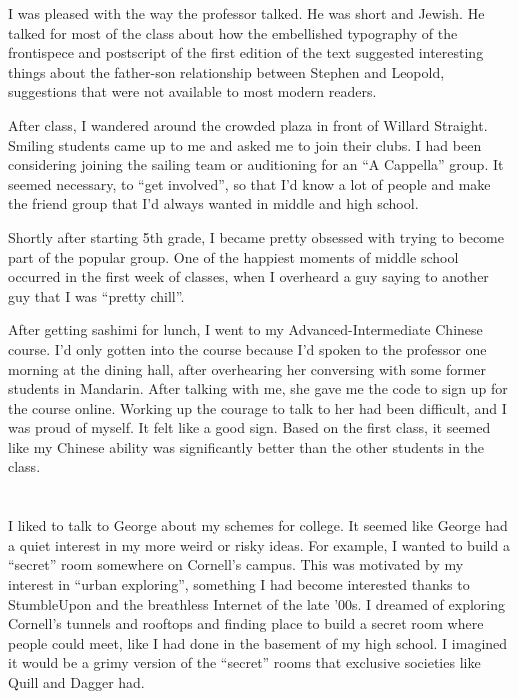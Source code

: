 I was pleased with the way the professor talked.  He was short and Jewish.  He
talked for most of the class about how the embellished typography of the
frontispece and postscript of the first edition of the text suggested
interesting things about the father-son relationship between Stephen and
Leopold, suggestions that were not available to most modern readers.

After class, I wandered around the crowded plaza in front of Willard Straight.
Smiling students came up to me and asked me to join their clubs.  I had been
considering joining the sailing team or auditioning for an ``A Cappella'' group.
It seemed necessary, to ``get involved'', so that I'd know a lot of people and
make the friend group that I'd always wanted in middle and high school.  

Shortly after starting 5th grade, I became pretty obsessed with trying to become
part of the popular group.  One of the happiest moments of middle school
occurred in the first week of classes, when I overheard a guy saying to another
guy that I was ``pretty chill''. 

After getting sashimi for lunch, I went to my Advanced-Intermediate Chinese
course.   I'd only gotten into the course because I'd spoken to the professor
one morning at the dining hall, after overhearing her conversing with some
former students in Mandarin.  After talking with me, she gave me the code to
sign up for the course online.  Working up the courage to talk to her had been
difficult, and I was proud of myself.  It felt like a good sign. Based on the
first class, it seemed like my Chinese ability was significantly better than the
other students in the class.

\section{}

I liked to talk to George about my schemes for college.  It seemed like George
had a quiet interest in my more weird or risky ideas.  For example, I wanted to
build a ``secret'' room somewhere on Cornell's campus.  This was motivated by my
interest in ``urban exploring'', something I had become interested thanks to
StumbleUpon and the breathless Internet of the late '00s.  I dreamed of
exploring Cornell's tunnels and rooftops and finding place to build a secret
room where people could meet, like I had done in the basement of my high school.
I imagined it would be a grimy version of the ``secret'' rooms that exclusive
societies like Quill and Dagger had. 

